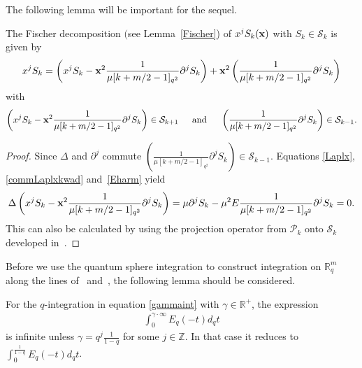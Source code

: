 \documentclass[pdftex]{sigma}
\newcommand{\mR}{\mathbb{R}}
\newcommand{\mZ}{\mathbb{Z}}
\newcommand{\cP}{\mathcal{P}}
\newcommand{\cS}{\mathcal{S}}
\numberwithin{equation}{section}
\begin{document}
The following lemma will be important for the sequel.
\begin{lemma}\label{xS}
The Fischer decomposition $($see Lemma~{\rm \ref{Fischer})} of $x^jS_k(\bold{x})$ with $S_k\in\cS_k$ is given by
\begin{gather*}
x^jS_k=\left(x^jS_k-\bold{x}^2\frac{1}{\mu[k+m/2-1]_{q^2}}\partial^jS_k\right)+\bold{x}^2\left(\frac{1}{\mu[k+m/2-1]_{q^2}}\partial^jS_k\right)
\end{gather*}
with
\begin{gather*}
\left(x^jS_k-\bold{x}^2\frac{1}{\mu[k+m/2-1]_{q^2}}\partial^jS_k\right)\in\cS_{k+1} \!\!\!\qquad \mbox{and} \qquad\!\!\! \left(\frac{1}{\mu[k+m/2-1]_{q^2}}\partial^jS_k\right)\in\cS_{k-1}.
\end{gather*}
\end{lemma}
\begin{proof}\sloppy
Since $\Delta$ and $\partial^j$ commute $\left(\frac{1}{\mu[k+m/2-1]_{q^2}}\partial^jS_k\right)\in\cS_{k-1}$. Equations \eqref{Laplx}, \eqref{commLaplxkwad} and~\eqref{Eharm} yield
\begin{gather*}
\Delta\left(x^jS_k-\bold{x}^2\frac{1}{\mu[k+m/2-1]_{q^2}}\partial^jS_k\right)=
\mu\partial^jS_k-\mu^2E\frac{1}{\mu[k+m/2-1]_{q^2}}\partial^jS_k=0.
\end{gather*}
This can also be calculated by using the projection operator from $\cP_k$ onto $\cS_k$ developed \linebreak in~\cite{MR2006509}.
\end{proof}


Before we use the quantum sphere integration to construct integration on $\mR^m_q$ along the lines of~\cite{MR1303081} and~\cite{MR1239953}, the following lemma should be considered.
\begin{lemma}
\label{intexpinf}
For the $q$-integration in equation \eqref{gammaint} with $\gamma\in\mR^+$, the expression
\begin{gather*}
\int_0^{\gamma\cdot\infty}E_q(-t)d_qt
\end{gather*}
is infinite unless $\gamma=q^{j}\frac{1}{1-q}$ for some $j\in\mZ$. In that case it reduces to $\int_0^{\frac{1}{1-q}}E_q(-t)d_qt$.
\end{lemma}
\end{document}
